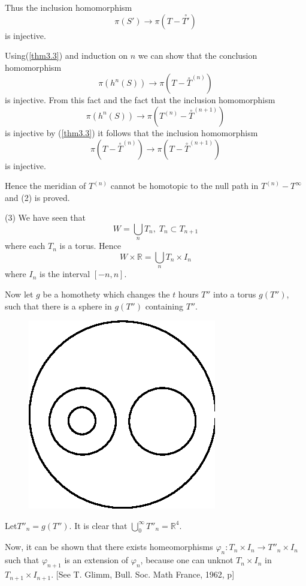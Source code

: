  Thus the inclusion homomorphism 
$$
\pi (S') \to \pi (T- \overset{\circ}{T'})
$$
is injective.

Using\pageoriginale (\ref{thm3.3}) and induction on $n$ we can show that the
conclusion homomorphism   
$$
\pi (h^n (S)) \to \pi (T -\overset{\circ}{T}^{(n)})
$$
is injective. From this fact and the fact that the inclusion 
homomorphism  
$$
\pi (h^n(S)) \to \pi (T^{(n)} - \overset{\circ}{T}^{(n+1)})  
$$
is injective by (\ref{thm3.3}) it follows that the inclusion homomorphism 
$$
\pi (T- \overset{\circ}{T}^{(n)}) \to \pi (T -
\overset{\circ}{T}^{(n+1)}) 
$$
is injective.

Hence the meridian of $T^{(n)}$ cannot be homotopic to the null path in
$T^{(n)} - T^{\infty}$ and (2) is proved. 

(3) We have seen that
$$
W = \bigcup_{n} T_n, \; T_n \subset T_{n+1} 
$$
where each $T_n$ is a torus. Hence 
$$
W \times \mathbb{R} = \bigcup_n T_n \times I_n 
$$
where $I_n$ is the interval $[-n, n]$. 

Now let $g$ be a homothety which changes the $t$ hours $T''$ into a torus
$g(T'')$, such that there is a sphere in $g(T'')$ containing $T''$. 
\begin{figure}[H]
\centering
\includegraphics{vol44-fig/fig44-16.eps}
\end{figure}

Let\pageoriginale $T''_n = g(T'')$. It is clear that
$\bigcup\limits_{0}^{\infty} T''_n = \mathbb{R}^4$. 

Now, it can be shown that there exists homeomorphisms $\varphi_n :
T_n \times I_n \to T''_n \times I_n$ such that $\varphi_{n+1}$ is an
extension of $\varphi_n$, because one can unknot $T_n \times I_n$ in
$T_{n+1} \times I_{n+1}$. [See T. Glimm, Bull. Soc. Math France, 1962,
  p] 

